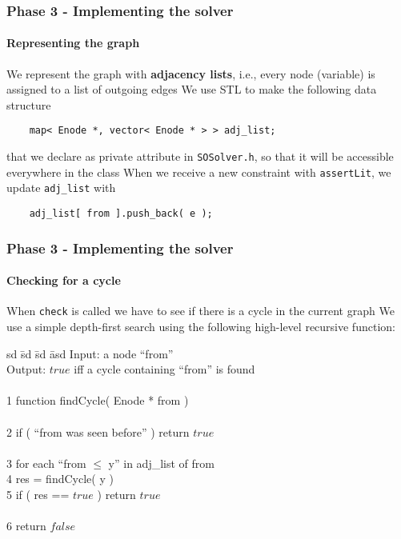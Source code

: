 \begin{frame}[fragile]
  \frametitle{Phase 3 - Implementing the solver}
  \framesubtitle{Representing the graph}

  We represent the graph with {\bf adjacency lists}, i.e., every node (variable) is
  assigned to a list of outgoing edges
  \vfill
  We use STL to make the following data structure
  \begin{verbatim}
    map< Enode *, vector< Enode * > > adj_list;
  \end{verbatim}
  that we declare as private attribute in \verb|SOSolver.h|, so that
  it will be accessible everywhere in the class
  \vfill
  When we receive a new constraint with \verb|assertLit|, we update
  \verb|adj_list| with 
  \begin{verbatim}
    adj_list[ from ].push_back( e );
  \end{verbatim}

\end{frame}

\begin{frame}[fragile]
  \frametitle{Phase 3 - Implementing the solver}
  \framesubtitle{Checking for a cycle}

  \scriptsize

  When \verb|check| is called we have to see if there is a cycle in the current graph
  \vfill
  We use a simple depth-first search using the following high-level recursive function:
  \vfill
  \begin{tabbing}
  sd \= sd \= sd \= asd \kill
  \> Input: a node ``from'' \\
  \> Output: $true$ iff a cycle containing ``from'' is found \\
  \> \\
  1 \> function findCycle( Enode * from ) \\
  \\
  2 \> \> if ( ``from was seen before'' ) return $true$ \\ 
  \\
  3 \> \> for each ``from $\leq$ y'' in adj\_list of from \\ 
  4 \> \> \> res = findCycle( y ) \\
  5 \> \> \> if ( res == $true$ ) return $true$ \\
  \\
  6 \> \> return $false$
  \end{tabbing}

\end{frame}


